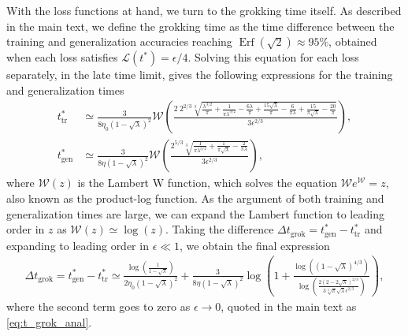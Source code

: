\documentclass[a4paper,11pt]{article}
\newcommand{\training}{\mathrm{tr}}
\newcommand{\gen}{\mathrm{gen}}
\begin{document}
With the loss functions at hand, we turn to the grokking time itself. As described in the main text, we define the grokking time as the time difference between the training and generalization accuracies reaching $\operatorname{Erf}(\sqrt{2})\approx95\%$, obtained when each loss satisfies $\mathcal{L}(t^*)= \epsilon/4$.
Solving this equation for each loss separately, in the late time limit, gives the following expressions for the training and generalization times
\begin{align}
    t^*_\training
    &\simeq
    \frac{3 }{8 \eta _0 \left(1-\sqrt{\lambda }\right)^2}
    \mathcal{W}\left(\frac{2\ 2^{2/3} \sqrt[3]{\frac{\lambda ^{3/2}}{\pi }+\frac{1}{\pi  \lambda ^{3/2}}-\frac{6 \lambda }{\pi }+\frac{15 \sqrt{\lambda }}{\pi }-\frac{6}{\pi  \lambda }+\frac{15}{\pi  \sqrt{\lambda }}-\frac{20}{\pi }}}{3 \epsilon^{2/3}}\right),
    \\
    t^*_\gen 
    &\simeq
    \frac{3 }{8 \eta  \left(1-\sqrt{\lambda }\right)^2}
    \mathcal{W}\left(\frac{ 2^{5/3} \sqrt[3]{\frac{1}{\pi  \lambda ^{3/2}}+\frac{1}{\pi  \sqrt{\lambda }}-\frac{2}{\pi  \lambda }}}{3 \epsilon ^{2/3}}\right),
\end{align}
where $\mathcal{W}(z)$ is the Lambert W function, which solves the equation $\mathcal{W} e^\mathcal{W}=z$, also known as the product-log function. As the argument of both training and generalization times are large, we can expand the Lambert function to leading order in $z$ as $\mathcal{W}(z)\simeq \log(z)$. Taking the difference $\Delta t_\mathrm{grok}= t^*_\gen - t^*_\training$ and expanding to leading order in $\epsilon \ll1$, we obtain the final expression
\begin{align}
\label{eq:t_grok_anal_corrected}
    \Delta t_\mathrm{grok}
    =
    t^*_\gen - t^*_\training
    \simeq
    \frac{\log \left(\frac{1}{1-\sqrt{\lambda }}\right)}{2 \eta_0  \left(1-\sqrt{\lambda }\right)^2}
    +
    \frac{3 }{8 \eta  \left(1-\sqrt{\lambda }\right)^2}
    \log \left(
    1+
    \frac{\log \left(\left(1-\sqrt{\lambda }\right)^{4/3}\right)}{\log \left(\frac{2 \left(2-2 \sqrt{\lambda }\right)^{2/3}}{3 \sqrt[3]{\pi } \sqrt{\lambda } {\epsilon}^{2/3}}\right)}
    \right),
\end{align}
where the second term goes to zero as $\epsilon \to 0$, quoted in the main text as \cref{eq:t_grok_anal}.
\end{document}
